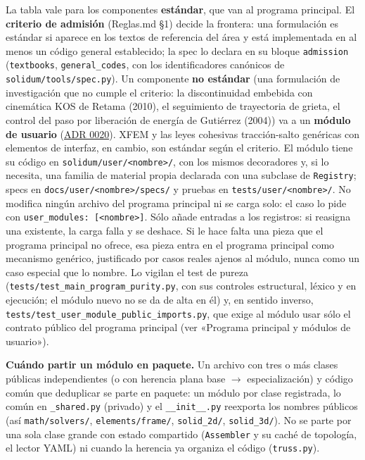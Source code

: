 \documentclass[11pt,oneside]{report}
\begin{document}
La tabla vale para los componentes \textbf{estándar}, que van al programa principal. El \textbf{criterio de admisión} (Reglas.md §1) decide la frontera: una formulación es estándar si aparece en los textos de referencia del área y está implementada en al menos un código general establecido; la spec lo declara en su bloque \texttt{admission} (\texttt{textbooks}, \texttt{general\_codes}, con los identificadores canónicos de \texttt{solidum/\allowbreak{}tools/\allowbreak{}spec.\allowbreak{}py}). Un componente \textbf{no estándar} (una formulación de investigación que no cumple el criterio: la discontinuidad embebida con cinemática KOS de Retama (2010), el seguimiento de trayectoria de grieta, el control del paso por liberación de energía de Gutiérrez (2004)) va a un \textbf{módulo de usuario} (\hyperref[adr:0020]{ADR 0020}). XFEM y las leyes cohesivas tracción-salto genéricas con elementos de interfaz, en cambio, son estándar según el criterio. El módulo tiene su código en \texttt{solidum/\allowbreak{}user/\allowbreak{}\textless{}nombre\textgreater{}/\allowbreak{}}, con los mismos decoradores y, si lo necesita, una familia de material propia declarada con una subclase de \texttt{Registry}; specs en \texttt{docs/\allowbreak{}user/\allowbreak{}\textless{}nombre\textgreater{}/\allowbreak{}specs/\allowbreak{}} y pruebas en \texttt{tests/\allowbreak{}user/\allowbreak{}\textless{}nombre\textgreater{}/\allowbreak{}}. No modifica ningún archivo del programa principal ni se carga solo: el caso lo pide con \texttt{user\_\allowbreak{}modules: [\textless{}nombre\textgreater{}]}. Sólo añade entradas a los registros: si reasigna una existente, la carga falla y se deshace. Si le hace falta una pieza que el programa principal no ofrece, esa pieza entra en el programa principal como mecanismo genérico, justificado por casos reales ajenos al módulo, nunca como un caso especial que lo nombre. Lo vigilan el test de pureza (\texttt{tests/\allowbreak{}test\_\allowbreak{}main\_\allowbreak{}program\_\allowbreak{}purity.\allowbreak{}py}, con sus controles estructural, léxico y en ejecución; el módulo nuevo no se da de alta en él) y, en sentido inverso, \texttt{tests/\allowbreak{}test\_\allowbreak{}user\_\allowbreak{}module\_\allowbreak{}public\_\allowbreak{}imports.\allowbreak{}py}, que exige al módulo usar sólo el contrato público del programa principal (ver «Programa principal y módulos de usuario»).

\textbf{Cuándo partir un módulo en paquete.} Un archivo con tres o más clases públicas independientes (o con herencia plana base \ensuremath{\to} especialización) y código común que deduplicar se parte en paquete: un módulo por clase registrada, lo común en \texttt{\_shared.py} (privado) y el \texttt{\_\_init\_\_.py} reexporta los nombres públicos (así \texttt{math/solvers/}, \texttt{elements/frame/}, \texttt{solid\_2d/}, \texttt{solid\_3d/}). No se parte por una sola clase grande con estado compartido (\texttt{Assembler} y su caché de topología, el lector YAML) ni cuando la herencia ya organiza el código (\texttt{truss.py}).
\end{document}
